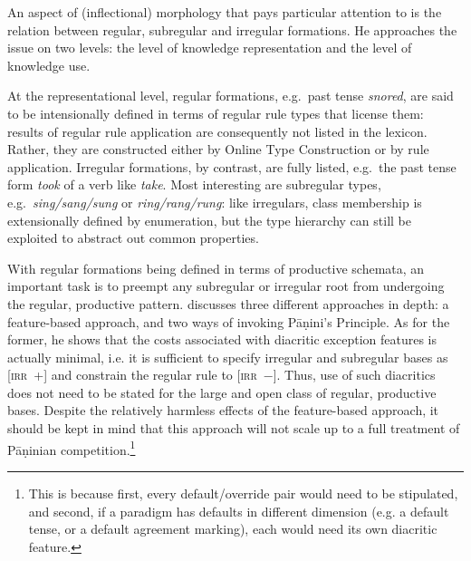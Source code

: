 \documentclass[output=paper
	        ,collection
	        ,collectionchapter
 	        ,biblatex
                ,babelshorthands
                ,newtxmath
                ,draftmode
                ,colorlinks, citecolor=brown
]{langscibook}
\newcommand{\mathplus}{{\normalfont +}}
\begin{document}
\begin{exe}
\begin{xlist}
An aspect of (inflectional) morphology that \citet{Koenig99} pays
particular attention to is the relation between regular, subregular
and irregular formations. He approaches the issue on two levels: the
level of knowledge representation and the level of knowledge use. 

At the representational level, regular formations, e.g.\ past tense
\textit{snored}, are said to be intensionally defined in terms of
regular rule types that license them: results of regular rule
application are consequently not listed in the lexicon. Rather, they are
constructed either by Online Type Construction or by rule application.
Irregular formations, by contrast, are fully listed, e.g.\ the past
tense form \textit{took} of a verb like \textit{take}. Most
interesting are subregular types, e.g.\ \textit{sing/sang/sung} or
\textit{ring/rang/rung}: like irregulars, class membership is
extensionally defined by enumeration, but the type hierarchy can still
be exploited to abstract out common properties.

With regular formations being defined in terms of productive schemata,
an important task is to preempt any subregular or irregular root from
undergoing the regular, productive pattern. \citet{Koenig99} discusses
three different approaches in depth: a feature-based approach, and two
ways of invoking Pāṇini's Principle. As for the former, he shows that
the costs associated with diacritic exception features is actually
minimal, i.e. it is sufficient to specify irregular and subregular
bases as \textsc{[irr~\mathplus{}]} and constrain the regular rule to
\textsc{[irr~$-$]}. Thus, use of such diacritics does not need to be
stated for the large and open class of regular, productive
bases. Despite the relatively harmless effects of the feature-based
approach, it should be kept in mind that this approach will not scale
up to a full treatment of Pāṇinian competition.\footnote{This is
  because first, every default/override pair would need to be
  stipulated, and second, if a paradigm has defaults in different
  dimension (e.g. a default tense, or a default agreement marking),
  each would need its own diacritic feature.}


\end{xlist}
\end{exe}
\end{document}
